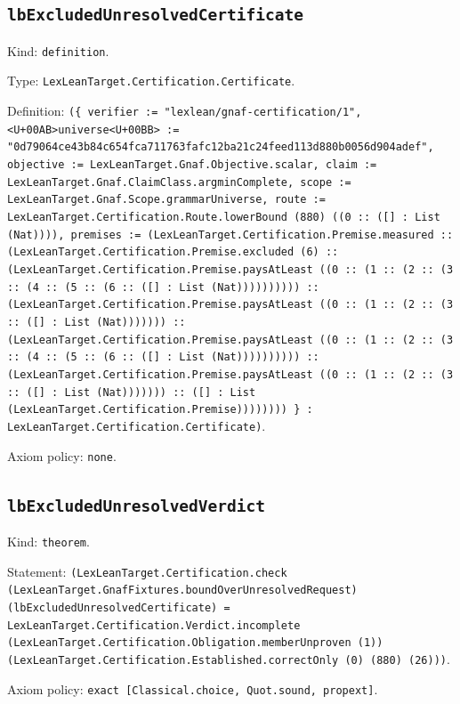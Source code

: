 \documentclass[11pt]{article}
\begin{document}
\subsection*{\texttt{lbExcludedUnresolvedCertificate}}
\noindent Kind: \texttt{definition}.\par
\noindent Type: \texttt{LexLeanTarget.Certification.Certificate}.\par
\noindent Definition: \texttt{(\{ verifier := "lexlean/gnaf-certification/1", <U+00AB>universe<U+00BB> := "0d79064ce43b84c654fca711763fafc12ba21c24feed113d880b0056d904adef", objective := LexLeanTarget.Gnaf.Objective.scalar, claim := LexLeanTarget.Gnaf.ClaimClass.argminComplete, scope := LexLeanTarget.Gnaf.Scope.grammarUniverse, route := LexLeanTarget.Certification.Route.lowerBound (880) ((0 :: ([] : List (Nat)))), premises := (LexLeanTarget.Certification.Premise.measured :: (LexLeanTarget.Certification.Premise.excluded (6) :: (LexLeanTarget.Certification.Premise.paysAtLeast ((0 :: (1 :: (2 :: (3 :: (4 :: (5 :: (6 :: ([] : List (Nat)))))))))) :: (LexLeanTarget.Certification.Premise.paysAtLeast ((0 :: (1 :: (2 :: (3 :: ([] : List (Nat))))))) :: (LexLeanTarget.Certification.Premise.paysAtLeast ((0 :: (1 :: (2 :: (3 :: (4 :: (5 :: (6 :: ([] : List (Nat)))))))))) :: (LexLeanTarget.Certification.Premise.paysAtLeast ((0 :: (1 :: (2 :: (3 :: ([] : List (Nat))))))) :: ([] : List (LexLeanTarget.Certification.Premise)))))))) \} : LexLeanTarget.Certification.Certificate)}.\par
\noindent Axiom policy: \texttt{none}.\par
\subsection*{\texttt{lbExcludedUnresolvedVerdict}}
\noindent Kind: \texttt{theorem}.\par
\noindent Statement: \texttt{(LexLeanTarget.Certification.check (LexLeanTarget.GnafFixtures.boundOverUnresolvedRequest) (lbExcludedUnresolvedCertificate) = LexLeanTarget.Certification.Verdict.incomplete (LexLeanTarget.Certification.Obligation.memberUnproven (1)) (LexLeanTarget.Certification.Established.correctOnly (0) (880) (26)))}.\par
\noindent Axiom policy: \texttt{exact [Classical.choice, Quot.sound, propext]}.\par
\end{document}
